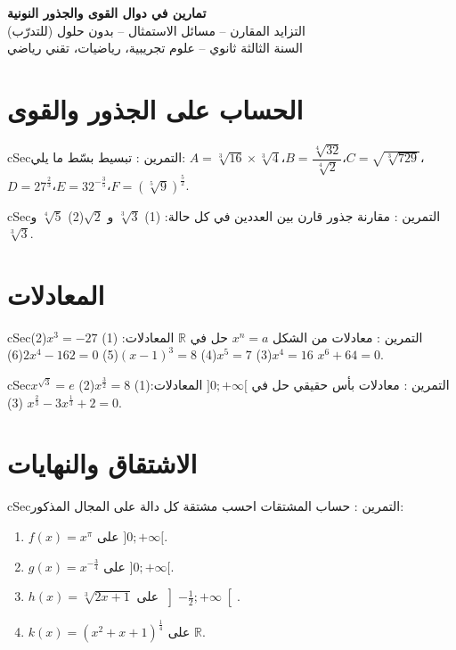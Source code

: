 \documentclass[12pt,a4paper]{article}
\newenvironment{BOX}[2]{\begin{otherlanguage}{english}\begin{arbox}{#1}{#2}}{\end{arbox}\end{otherlanguage}}
\newcounter{exo}
\newenvironment{tamrin}[1]{\stepcounter{exo}\begin{BOX}{cSec}{التمرين \theexo: #1}}{\end{BOX}}
\newenvironment{LTR}{\begin{otherlanguage}{english}}{\end{otherlanguage}}
\newcommand{\R}{\mathbb{R}}
\begin{document}
\begin{LTR}
\begin{tcolorbox}[enhanced,colback=cSec,colframe=cSec,arc=3mm,halign=center,boxrule=0pt,top=12pt,bottom=12pt,before upper={\selectlanguage{arabic}}]
{\color{white}\fontsize{26}{32}\selectfont\bfseries تمارين في دوال القوى والجذور النونية}\\[8pt]
{\color{white}\large التزايد المقارن -- مسائل الاستمثال -- بدون حلول (للتدرّب)}\\[5pt]
{\color{white}\large السنة الثالثة ثانوي -- علوم تجريبية، رياضيات، تقني رياضي}
\end{tcolorbox}
\end{LTR}

\section{الحساب على الجذور والقوى}
\begin{tamrin}{تبسيط}
بسّط ما يلي:\quad
$A=\sqrt[3]{16}\times\sqrt[3]{4}$،\quad $B=\dfrac{\sqrt[4]{32}}{\sqrt[4]{2}}$،\quad $C=\sqrt{\sqrt[3]{729}}$،\quad $D=27^{\frac{2}{3}}$،\quad $E=32^{-\frac{3}{5}}$،\quad $F=\left(\sqrt[5]{9}\right)^{\frac{5}{2}}$.
\end{tamrin}

\begin{tamrin}{مقارنة جذور}
قارن بين العددين في كل حالة: \quad (1) $\sqrt[3]{3}$ و $\sqrt{2}$\qquad (2) $\sqrt[4]{5}$ و $\sqrt[3]{3}$.
\end{tamrin}

\section{المعادلات}
\begin{tamrin}{معادلات من الشكل $x^{n}=a$}
حل في $\R$ المعادلات:\quad
(1) $x^{3}=-27$\quad (2) $x^{4}=16$\quad (3) $x^{5}=7$\quad (4) $(x-1)^{3}=8$\quad (5) $2x^{4}-162=0$\quad (6) $x^{6}+64=0$.
\end{tamrin}

\begin{tamrin}{معادلات بأس حقيقي}
حل في $]0;+\infty[$ المعادلات:\quad (1) $x^{\frac{3}{2}}=8$\qquad (2) $x^{\sqrt{3}}=e$\qquad (3) $x^{\frac{2}{3}}-3x^{\frac{1}{3}}+2=0$.
\end{tamrin}

\section{الاشتقاق والنهايات}
\begin{tamrin}{حساب المشتقات}
احسب مشتقة كل دالة على المجال المذكور:
\begin{enumerate}[label=(\arabic*)]
\item $f(x)=x^{\pi}$ على $]0;+\infty[$.
\item $g(x)=x^{-\frac{3}{4}}$ على $]0;+\infty[$.
\item $h(x)=\sqrt[3]{2x+1}$ على $\left]-\frac{1}{2};+\infty\right[$.
\item $k(x)=\left(x^{2}+x+1\right)^{\frac{1}{4}}$ على $\R$.
\end{enumerate}
\end{tamrin}
\end{document}
